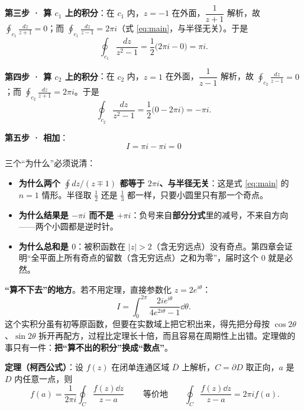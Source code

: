 \documentclass[11pt]{ctexart}
\let\origsubhdr\subhdr
\renewcommand{\subhdr}[1]{\par\needspace{4\baselineskip}\origsubhdr{#1}}
\let\orighdr\hdr
\renewcommand{\hdr}[2]{\par\needspace{9\baselineskip}\orighdr{#1}{#2}}
\begin{document}
\textbf{第三步 · 算 $c_1$ 上的积分}：在 $c_1$ 内，$z=-1$ 在外面，$\dfrac{1}{z+1}$ 解析，故 $\displaystyle\oint_{c_1}\frac{dz}{z+1}=0$；而 $\displaystyle\oint_{c_1}\frac{dz}{z-1}=2\pi i$（式 \eqref{eq:main}，与半径无关）。于是
\[ \oint_{c_1}\frac{dz}{z^{2}-1}=\frac12\bigl(2\pi i-0\bigr)=\pi i . \]

\textbf{第四步 · 算 $c_2$ 上的积分}：在 $c_2$ 内，$z=1$ 在外面，$\dfrac{1}{z-1}$ 解析，故 $\displaystyle\oint_{c_2}\frac{dz}{z-1}=0$；而 $\displaystyle\oint_{c_2}\frac{dz}{z+1}=2\pi i$。于是
\[ \oint_{c_2}\frac{dz}{z^{2}-1}=\frac12\bigl(0-2\pi i\bigr)=-\pi i . \]

\textbf{第五步 · 相加}：
\[ \boxed{\;I=\pi i-\pi i=0\;} \]

三个“为什么”必须说清：

\begin{itemize}
\item[(1)] \textbf{为什么两个 $\oint dz/(z\mp1)$ 都等于 $2\pi i$、与半径无关}：这是式 \eqref{eq:main} 的 $n=1$ 情形。半径取 $\tfrac12$ 还是 $\tfrac13$ 都一样，只要小圆里只有那一个奇点。
\item[(2)] \textbf{为什么结果是 $-\pi i$ 而不是 $+\pi i$}：负号来自\textbf{部分分式}里的减号，不来自方向——两个小圆都是逆时针。
\item[(3)] \textbf{为什么总和是 $0$}：被积函数在 $|z|>2$（含无穷远点）没有奇点。第四章会证明“全平面上所有奇点的留数（含无穷远点）之和为零”，届时这个 $0$ 就是必然。
\end{itemize}

\textbf{“算不下去”的地方}。若不用定理，直接参数化 $z=2e^{i\theta}$：
\[ I=\int_0^{2\pi}\frac{2ie^{i\theta}}{4e^{2i\theta}-1}\dd\theta . \]
这个实积分虽有初等原函数，但要在实数域上把它积出来，得先把分母按 $\cos2\theta$、$\sin2\theta$ 拆开再配方，过程比定理长十倍，而且容易在周期性上出错。定理做的事只有一件：\textbf{把“算不出的积分”换成“数点”}。


\flowerrule



\textbf{定理（柯西公式）}：设 $f(z)$ 在闭单连通区域 $\overline{D}$ 上解析，$C=\partial D$ 取正向，$a$ 是 $D$ 内任意一点，则
\begin{equation}\label{eq:cauchy}
\boxed{\;f(a)=\frac{1}{2\pi i}\oint_C\frac{f(z)\dd z}{z-a}\;}
\qquad\text{等价地}\qquad
\oint_C\frac{f(z)\dd z}{z-a}=2\pi i f(a).
\end{equation}
\end{document}
